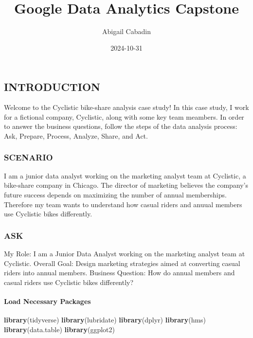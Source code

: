 \documentclass[
]{article}
\title{Google Data Analytics Capstone}
\author{Abigail Cabadin}
\date{2024-10-31}
\newenvironment{Shaded}{\begin{snugshade}}{\end{snugshade}}
\newcommand{\FunctionTok}[1]{\textcolor[rgb]{0.13,0.29,0.53}{\textbf{#1}}}
\newcommand{\NormalTok}[1]{#1}
\begin{document}
\maketitle

\subsection{INTRODUCTION}\label{introduction}

Welcome to the Cyclistic bike-share analysis case study! In this case
study, I work for a fictional company, Cyclistic, along with some key
team meambers. In order to answer the business questions, follow the
steps of the data analysis process: Ask, Prepare, Process, Analyze,
Share, and Act.

\subsubsection{SCENARIO}\label{scenario}

I am a junior data analyst working on the marketing analyst team at
Cyclistic, a bike-share company in Chicago. The director of marketing
believes the company's future success depends on maximizing the number
of annual memberships. Therefore my team wants to understand how casual
riders and anuual members use Cyclistic bikes differently.

\subsubsection{ASK}\label{ask}

My Role: I am a Junior Data Analyst working on the marketing analyst
team at Cyclistic. Overall Goal: Design marketing strategies aimed at
converting casual riders into annual members. Business Question: How do
annual members and casual riders use Cyclistic bikes differently?

\paragraph{Load Necessary Packages}\label{load-necessary-packages}

\begin{Shaded}
\begin{Highlighting}[]
\FunctionTok{library}\NormalTok{(tidyverse)}
\FunctionTok{library}\NormalTok{(lubridate)}
\FunctionTok{library}\NormalTok{(dplyr)}
\FunctionTok{library}\NormalTok{(hms)}
\FunctionTok{library}\NormalTok{(data.table)}
\FunctionTok{library}\NormalTok{(ggplot2)}
\end{Highlighting}
\end{Shaded}
\end{document}
